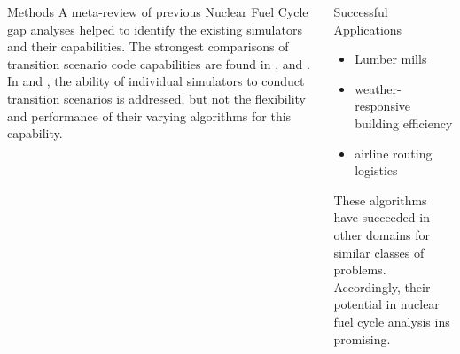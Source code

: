 \documentclass[final]{beamer}
\newlength{\onecolwid}
\newlength{\twocolwid}
\begin{document}
\begin{frame}[t]
\begin{columns}[t]
\begin{column}{\twocolwid}
\begin{columns}[t,totalwidth=\twocolwid] %

\begin{column}{\onecolwid}\vspace{-.6in} %


\begin{block}{Methods}
	A meta-review of previous Nuclear Fuel Cycle gap analyses helped to identify the existing
	simulators and their capabilities. The strongest comparisons of transition scenario
	code capabilities are found in \cite{boucher_international_2010}, \cite{brown_identification_2016} and \cite{mccarthy_benchmark_2012}.
	In \cite{carre_overview_2009} and \cite{hoffman_expanded_2016}, the ability of
	individual simulators to conduct transition scenarios is addressed, but not the
	flexibility and performance of their varying algorithms for this capability.
	

\end{block}


\end{column} %

\begin{column}{\onecolwid}\vspace{-.6in} %


\begin{block}{Successful Applications}
{\large 	\begin{itemize}
		\item Lumber mills \cite{yanex_agent-based_2009}
		\item weather-responsive building efficiency \cite{gonzalez_detailed_2002, kusiak_data-driven_2010}
		\item airline routing logistics \cite{shebalov_practical_2009}
	\end{itemize}
	}
These algorithms have succeeded in other domains for similar classes of problems.
Accordingly, their potential in nuclear fuel cycle analysis ins promising.
\end{block}


\end{column}
\end{columns}
\end{column}
\end{columns}
\end{frame}
\end{document}
